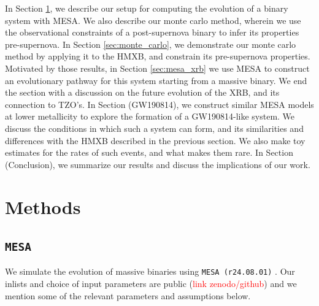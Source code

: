 \documentclass[linenumbers,trackchanges,twocolumn]{aastex701}
\newcommand{\red}{\textcolor{red}}
\begin{document}
In Section \ref{sec:methods}, we describe our setup for computing the evolution of a binary system with MESA. We also describe our monte carlo method, wherein we use the observational constraints of a post-supernova binary to infer its properties pre-supernova. In Section \ref{sec:monte_carlo}, we demonstrate our monte carlo method by applying it to the HMXB, and constrain its pre-supernova properties. Motivated by those results, in Section \ref{sec:mesa_xrb} we use MESA to construct an evolutionary pathway for this system starting from a massive binary. We end the section with a discussion on the future evolution of the XRB, and its connection to TZO's. In Section (GW190814), we construct similar MESA models at lower metallicity to explore the formation of a GW190814-like system. We discuss the conditions in which such a system can form, and its similarities and differences with the HMXB described in the previous section. We also make toy estimates for the rates of such events, and what makes them rare. In Section (Conclusion), we summarize our results and discuss the implications of our work.

\section{Methods} \label{sec:methods}

\subsection{\texttt{MESA}}

We simulate the evolution of massive binaries using \texttt{MESA (r24.08.01)} \citep{2011ApJS..192....3P,2013ApJS..208....4P,2015ApJS..220...15P,2018ApJS..234...34P,2019ApJS..243...10P,2023ApJS..265...15J}. Our inlists and choice of input parameters are public (\red{link zenodo/github}) and we mention some of the relevant parameters and assumptions below.

\end{document}
